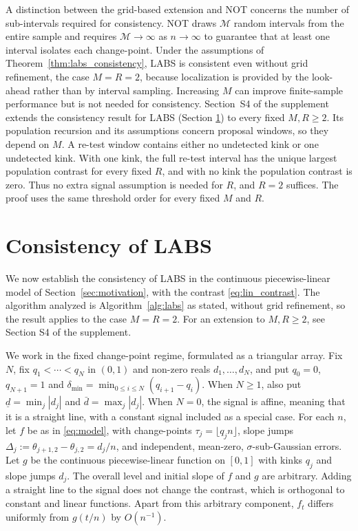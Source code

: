 \documentclass[12pt, a4paper]{article}
\begin{document}
A distinction between the grid-based extension and NOT concerns the number of sub-intervals required for consistency. NOT draws $\mathcal{M}$ random intervals from the entire sample and requires $\mathcal{M} \to \infty$ as $n \to \infty$ to guarantee that at least one interval isolates each change-point. Under the assumptions of Theorem~\ref{thm:labs_consistency}, LABS is consistent even without grid refinement, the case $M=R=2$, because localization is provided by the look-ahead rather than by interval sampling. Increasing $M$ can improve finite-sample performance but is not needed for consistency. Section~S4 of the supplement extends the consistency result for LABS (Section \ref{sec:consistency}) to every fixed $M,R\geq2$. Its population recursion and its assumptions concern proposal windows, so they depend on $M$. A re-test window contains either no undetected kink or one undetected kink. With one kink, the full re-test interval has the unique largest population contrast for every fixed $R$, and with no kink the population contrast is zero. Thus no extra signal assumption is needed for $R$, and $R=2$ suffices. The proof uses the same threshold order for every fixed $M$ and $R$.

\section{Consistency of LABS}
\label{sec:consistency}

We now establish the consistency of LABS in the continuous piecewise-linear model of Section~\ref{sec:motivation}, with the contrast \eqref{eq:lin_contrast}. The algorithm analyzed is Algorithm~\ref{alg:labs} as stated, without grid refinement, so the result applies to the case $M = R = 2$. For an extension to $M, R \ge 2$, see Section S4 of the supplement.

We work in the fixed change-point regime, formulated as a triangular array. Fix $N$, fix $q_1 < \cdots < q_N$ in $(0,1)$ and non-zero reals $d_1, \ldots, d_N$, and put $q_0=0$, $q_{N+1}=1$ and $\delta_{\min}=\min_{0\leq i\leq N}(q_{i+1}-q_i)$. When $N\geq1$, also put $\underline d=\min_j|d_j|$ and $\bar d=\max_j|d_j|$. When $N=0$, the signal is affine, meaning that it is a straight line, with a constant signal included as a special case. For each $n$, let $f$ be as in \eqref{eq:model}, with change-points $\tau_j=\lfloor q_jn\rfloor$, slope jumps $\Delta_j:=\theta_{j+1,2}-\theta_{j,2}=d_j/n$, and independent, mean-zero, $\sigma$-sub-Gaussian errors. Let $g$ be the continuous piecewise-linear function on $[0,1]$ with kinks $q_j$ and slope jumps $d_j$. The overall level and initial slope of $f$ and $g$ are arbitrary. Adding a straight line to the signal does not change the contrast, which is orthogonal to constant and linear functions. Apart from this arbitrary component, $f_t$ differs uniformly from $g(t/n)$ by $O(n^{-1})$.
\end{document}
